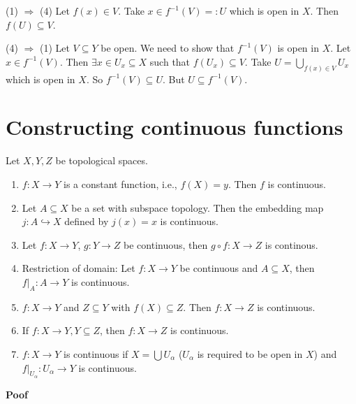 \documentclass[main.tex]{subfiles}
\begin{document}
\par (1) $\Rightarrow$ (4) Let $f(x) \in V$. Take $x\in f^{-1}(V) =: U$ which is open in $X$. Then $f(U) \subseteq V$.

\par (4) $\Rightarrow$ (1) Let $V \subseteq Y$ be open. We need to show that $f^{-1}(V)$ is open in $X$. Let $x\in f^{-1} (V)$. Then $\exists x\in U_x \subseteq X$ such that $f(U_x) \subseteq V$. Take $U = \bigcup_{f(x)\in V} U_x$ which is open in $X$. So $f^{-1} (V) \subseteq U$. But $U \subseteq f^{-1} (V)$. 

\section{Constructing continuous functions} 
\begin{theorem}
    Let $X, Y, Z$ be topological spaces. 
    \begin{enumerate}
        \item $f: X \rightarrow Y$ is a constant function, i.e., $f(X) = y$. Then $f$ is continuous. 
        \item Let $A \subseteq X$ be a set with subspace topology. Then the embedding map $j: A \hookrightarrow X$ defined by $j(x) = x$ is continuous. 
        \item Let $f: X \rightarrow Y$, $g: Y \rightarrow Z$ be continuous, then $g\circ f: X \rightarrow Z$ is continous. 
        \item Restriction of domain: Let $f: X \rightarrow Y$ be continuous and $A \subseteq X$, then $f|_A: A \rightarrow Y$ is continuous. 
        \item $f: X \rightarrow Y$ and $Z \subseteq Y$ with $f(X) \subseteq Z$. Then $f: X \rightarrow Z$ is continuous. 
        \item If $f: X \rightarrow Y, Y \subseteq Z$, then $f: X \rightarrow Z$ is continuous. 
        \item $f: X \rightarrow Y$ is continuous if $X = \bigcup U_{\alpha}$ ($U_{\alpha}$ is required to be open in $X$) and $f|_{U_{\alpha}}: U_{\alpha} \rightarrow Y$ is continuous. 
    \end{enumerate} 
\end{theorem}
\par \noindent \textbf{Poof} 
\end{document}
